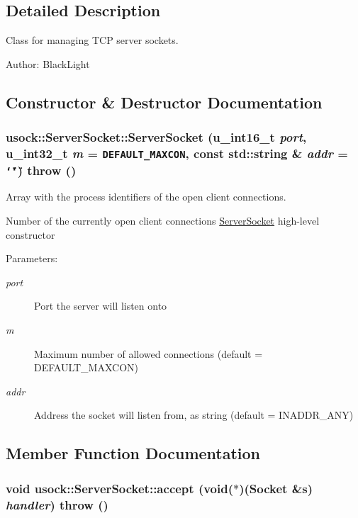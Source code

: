 \subsection{Detailed Description}
Class for managing TCP server sockets. 

\begin{Desc}
\item[Author:]BlackLight \end{Desc}


\subsection{Constructor \& Destructor Documentation}
\hypertarget{classusock_1_1ServerSocket_0ac1908d4a4afb675715ae0ad994e870}{
\subsubsection[{ServerSocket}]{\setlength{\rightskip}{0pt plus 5cm}usock::ServerSocket::ServerSocket (u\_\-int16\_\-t {\em port}, \/  u\_\-int32\_\-t {\em m} = {\tt DEFAULT\_\-MAXCON}, \/  const std::string \& {\em addr} = {\tt \char`\"{}\char`\"{}})  throw ()}}
\label{classusock_1_1ServerSocket_0ac1908d4a4afb675715ae0ad994e870}


Array with the process identifiers of the open client connections. 

Number of the currently open client connections \hyperlink{classusock_1_1ServerSocket}{ServerSocket} high-level constructor \begin{Desc}
\item[Parameters:]
\begin{description}
\item[{\em port}]Port the server will listen onto \item[{\em m}]Maximum number of allowed connections (default = DEFAULT\_\-MAXCON) \item[{\em addr}]Address the socket will listen from, as string (default = INADDR\_\-ANY) \end{description}
\end{Desc}


\subsection{Member Function Documentation}
\hypertarget{classusock_1_1ServerSocket_0ef5b201140a37c5d7c42aced9a45f2e}{
\subsubsection[{accept}]{\setlength{\rightskip}{0pt plus 5cm}void usock::ServerSocket::accept (void($\ast$)({\bf Socket} \&s) {\em handler})  throw ()}}
\label{classusock_1_1ServerSocket_0ef5b201140a37c5d7c42aced9a45f2e}


